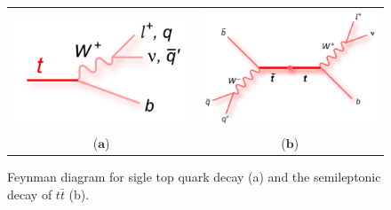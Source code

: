 \begin{figure}[htp]
\centering
\begin{tabular}{cc}
\hspace{-0.3cm}
\includegraphics[scale=0.19]{fig/chapt2/single_top_decay.png}
& \hspace{-0.5cm} \includegraphics[scale=0.19]{fig/chapt2/ttbar_decay.png}\\
   ($\mathbf{a}$)\qquad\qquad\qquad&($\mathbf{b}$)\qquad\\
\end{tabular}
\caption{Feynman diagram for sigle top quark decay (a) and the semileptonic decay of $t\bar{t} $ (b).}\label{fig:top_decay}
\end{figure}

